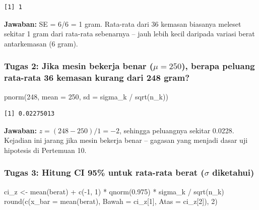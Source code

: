 \documentclass[
  indonesian,
  letterpaper,
]{book}
\newenvironment{Shaded}{\begin{snugshade}}{\end{snugshade}}
\newcommand{\AttributeTok}[1]{\textcolor[rgb]{0.40,0.45,0.13}{#1}}
\newcommand{\DecValTok}[1]{\textcolor[rgb]{0.68,0.00,0.00}{#1}}
\newcommand{\FloatTok}[1]{\textcolor[rgb]{0.68,0.00,0.00}{#1}}
\newcommand{\FunctionTok}[1]{\textcolor[rgb]{0.28,0.35,0.67}{#1}}
\newcommand{\NormalTok}[1]{\textcolor[rgb]{0.00,0.23,0.31}{#1}}
\newcommand{\OtherTok}[1]{\textcolor[rgb]{0.00,0.23,0.31}{#1}}
\newcommand{\SpecialCharTok}[1]{\textcolor[rgb]{0.37,0.37,0.37}{#1}}
\begin{document}
\begin{verbatim}
[1] 1
\end{verbatim}

\textbf{Jawaban:} SE = 6/6 = 1 gram. Rata-rata dari 36 kemasan biasanya
meleset sekitar 1 gram dari rata-rata sebenarnya -- jauh lebih kecil
daripada variasi berat antarkemasan (6 gram).

\subsubsection{\texorpdfstring{\textbf{Tugas 2: Jika mesin bekerja benar
(\(\mu = 250\)), berapa peluang rata-rata 36 kemasan kurang dari 248
gram?}}{Tugas 2: Jika mesin bekerja benar (\textbackslash mu = 250), berapa peluang rata-rata 36 kemasan kurang dari 248 gram?}}\label{tugas-2-jika-mesin-bekerja-benar-mu-250-berapa-peluang-rata-rata-36-kemasan-kurang-dari-248-gram}

\begin{Shaded}
\begin{Highlighting}[]
\FunctionTok{pnorm}\NormalTok{(}\DecValTok{248}\NormalTok{, }\AttributeTok{mean =} \DecValTok{250}\NormalTok{, }\AttributeTok{sd =}\NormalTok{ sigma\_k }\SpecialCharTok{/} \FunctionTok{sqrt}\NormalTok{(n\_k))}
\end{Highlighting}
\end{Shaded}

\begin{verbatim}
[1] 0.02275013
\end{verbatim}

\textbf{Jawaban:} \(z = (248 - 250)/1 = -2\), sehingga peluangnya
sekitar 0.0228. Kejadian ini jarang jika mesin bekerja benar -- gagasan
yang menjadi dasar uji hipotesis di Pertemuan 10.

\subsubsection{\texorpdfstring{\textbf{Tugas 3: Hitung CI 95\% untuk
rata-rata berat (\(\sigma\)
diketahui)}}{Tugas 3: Hitung CI 95\% untuk rata-rata berat (\textbackslash sigma diketahui)}}\label{tugas-3-hitung-ci-95-untuk-rata-rata-berat-sigma-diketahui}

\begin{Shaded}
\begin{Highlighting}[]
\NormalTok{ci\_z }\OtherTok{\textless{}{-}} \FunctionTok{mean}\NormalTok{(berat) }\SpecialCharTok{+} \FunctionTok{c}\NormalTok{(}\SpecialCharTok{{-}}\DecValTok{1}\NormalTok{, }\DecValTok{1}\NormalTok{) }\SpecialCharTok{*} \FunctionTok{qnorm}\NormalTok{(}\FloatTok{0.975}\NormalTok{) }\SpecialCharTok{*}\NormalTok{ sigma\_k }\SpecialCharTok{/} \FunctionTok{sqrt}\NormalTok{(n\_k)}
\FunctionTok{round}\NormalTok{(}\FunctionTok{c}\NormalTok{(}\AttributeTok{x\_bar =} \FunctionTok{mean}\NormalTok{(berat), }\AttributeTok{Bawah =}\NormalTok{ ci\_z[}\DecValTok{1}\NormalTok{], }\AttributeTok{Atas =}\NormalTok{ ci\_z[}\DecValTok{2}\NormalTok{]), }\DecValTok{2}\NormalTok{)}
\end{Highlighting}
\end{Shaded}
\end{document}
